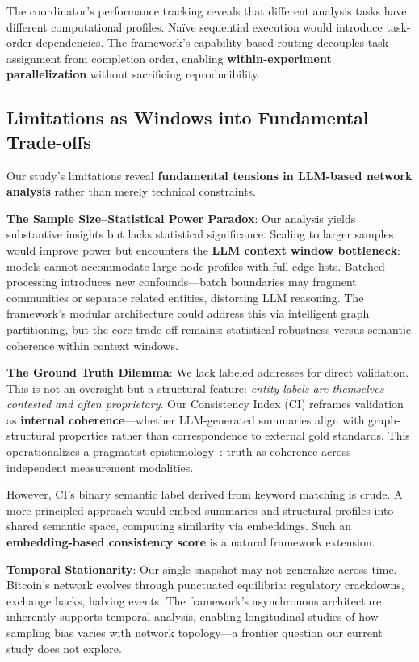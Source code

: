 The coordinator's performance tracking reveals that different analysis tasks have different computational profiles. Naïve sequential execution would introduce task-order dependencies. The framework's capability-based routing decouples task assignment from completion order, enabling \textbf{within-experiment parallelization} without sacrificing reproducibility.

\subsection{Limitations as Windows into Fundamental Trade-offs}

Our study's limitations reveal \textbf{fundamental tensions in LLM-based network analysis} rather than merely technical constraints.

\textbf{The Sample Size--Statistical Power Paradox}: Our analysis yields substantive insights but lacks statistical significance. Scaling to larger samples would improve power but encounters the \textbf{LLM context window bottleneck}: models cannot accommodate large node profiles with full edge lists. Batched processing introduces new confounds---batch boundaries may fragment communities or separate related entities, distorting LLM reasoning. The framework's modular architecture could address this via intelligent graph partitioning, but the core trade-off remains: statistical robustness versus semantic coherence within context windows.

\textbf{The Ground Truth Dilemma}: We lack labeled addresses for direct validation. This is not an oversight but a structural feature: \textit{entity labels are themselves contested and often proprietary}. Our Consistency Index (CI) reframes validation as \textbf{internal coherence}---whether LLM-generated summaries align with graph-structural properties rather than correspondence to external gold standards. This operationalizes a pragmatist epistemology~\cite{dewey1938logic}: truth as coherence across independent measurement modalities.

However, CI's binary semantic label derived from keyword matching is crude. A more principled approach would embed summaries and structural profiles into shared semantic space, computing similarity via embeddings. Such an \textbf{embedding-based consistency score} is a natural framework extension.

\textbf{Temporal Stationarity}: Our single snapshot may not generalize across time. Bitcoin's network evolves through punctuated equilibria: regulatory crackdowns, exchange hacks, halving events. The framework's asynchronous architecture inherently supports temporal analysis, enabling longitudinal studies of how sampling bias varies with network topology---a frontier question our current study does not explore.

